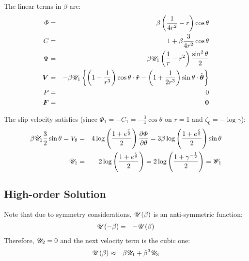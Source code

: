 The linear terms in $\beta$ are:
\begin{eqnarray}
\varPhi &=& \beta \left(\frac{1}{4r^2} - r\right)\cos\theta \\
C &=& 1 + \beta \frac{3}{4r^2} \cos\theta \\
\Psi &=& \beta \mathscr{U}_1 \left(\frac{1}{r} - r^2\right) \frac{\sin^2\theta}{2} \\
\boldsymbol{V} &=& -\beta \mathscr{U}_1 \left\{\left(1 - \frac{1}{r^3}\right)\cos\theta \cdot \hat{\boldsymbol{r}} - 
                               \left(1 + \frac{1}{2r^3}\right) \sin\theta \cdot \hat{\boldsymbol{\theta}}\right\} \\
P &=& 0 \\
\boldsymbol{F} &=& \boldsymbol{0}
\end{eqnarray}

The slip velocity satisfies (since $\varPhi_1 = -C_1 = -\frac{3}{4} \cos\theta$ on $r=1$
and $\zeta_0 = -\log\gamma$):
\begin{eqnarray}
\beta \mathscr{U}_1 \frac{3}{2} \sin\theta =
V_\theta &=& 4 \log \left(\frac{1 + e ^ \frac{\zeta}{2}}{2}\right) \frac{\partial \varPhi}{\partial \theta} 
=
 3 \beta \log \left(\frac{1 + e ^ \frac{\zeta}{2}}{2}\right) \sin\theta \\
\mathscr{U}_1 &=& 2 \log \left(\frac{1 + e ^ \frac{\zeta}{2}}{2}\right) 
       =  2 \log \left(\frac{1 + \gamma ^ {-\frac{1}{2}}}{2}\right) = \mathscr{W}_1
\end{eqnarray}

\subsection{High-order Solution}
Note that due to symmetry considerations, $\mathscr{U}(\beta)$ is an anti-symmetric function:
\begin{eqnarray}
\mathscr{U}(-\beta) &=& -\mathscr{U}(\beta)
\end{eqnarray}
Therefore, $\mathscr{U}_2 = 0$ and the next velocity term is the cubic one:
\begin{eqnarray}
\mathscr{U}(\beta) &\approx& \beta \mathscr{U}_1 + \beta^3 \mathscr{U}_3
\end{eqnarray}

